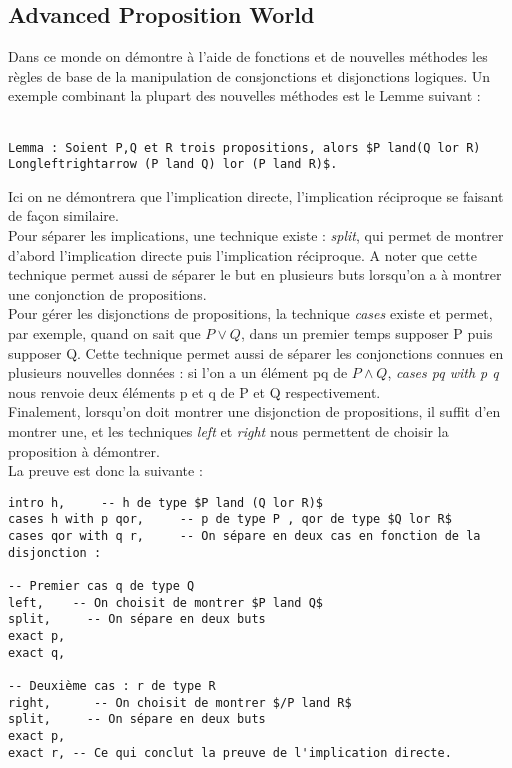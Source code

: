\subsection{Advanced Proposition World}
Dans ce monde on démontre à l'aide de fonctions et de nouvelles méthodes les règles de base de la manipulation de consjonctions et disjonctions logiques. Un exemple combinant la plupart des nouvelles méthodes est le Lemme suivant : \\
\\
\begin{verbatim}
Lemma : Soient P,Q et R trois propositions, alors $P land(Q lor R) Longleftrightarrow (P land Q) lor (P land R)$.
\end{verbatim}
Ici on ne démontrera que l'implication directe, l'implication réciproque se faisant de façon similaire.\\
Pour séparer les implications, une technique existe : \textit{split}, qui permet de montrer d'abord l'implication directe puis l'implication réciproque. A noter que cette technique permet aussi de séparer le but en plusieurs buts lorsqu'on a à montrer une conjonction de propositions.\\
Pour gérer les disjonctions de propositions, la technique \textit{cases} existe et permet, par exemple, quand on sait que $P\lor Q$, dans un premier temps supposer P puis supposer Q. Cette technique permet aussi de séparer les conjonctions connues en plusieurs nouvelles données : si l'on a un élément pq de $P\land Q$, \textit{cases pq with p q} nous renvoie deux éléments p et q de P et Q respectivement.\\
Finalement, lorsqu'on doit montrer une disjonction de propositions, il suffit d'en montrer une, et les techniques \textit{left} et \textit{right} nous permettent de choisir la proposition à démontrer.\\
La preuve est donc la suivante : \\
\begin{verbatim}
intro h,     -- h de type $P land (Q lor R)$
cases h with p qor,     -- p de type P , qor de type $Q lor R$
cases qor with q r,     -- On sépare en deux cas en fonction de la disjonction :

-- Premier cas q de type Q
left,    -- On choisit de montrer $P land Q$
split,     -- On sépare en deux buts
exact p,
exact q,

-- Deuxième cas : r de type R
right,      -- On choisit de montrer $/P land R$
split,     -- On sépare en deux buts
exact p,
exact r, -- Ce qui conclut la preuve de l'implication directe.
\end{verbatim}
